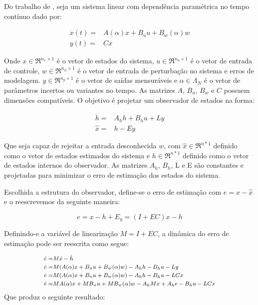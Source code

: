 Do trabalho de \cite{Dias2022ItaloDias}, seja um sistema linear com dependência paramétrica no tempo contínuo dado por:

\begin{equation}\label{eq:part_linsys}
    \begin{split}
        \dot{x}(t)=&A(\alpha)x+B_uu+B_w(\alpha)w\\
              y(t)=&Cx
    \end{split}
\end{equation}

Onde $x \in \Re^{n_{x} \times 1}$ é o vetor de estados do sistema, $u \in \Re^{n_{u} \times 1}$ é o vetor de entrada de controle, $w \in \Re^{n_{w} \times 1}$ é o vetor de entrada de perturbação no sistema e erros de modelagem.  $y \in \Re^{n_{y} \times 1}$ é o vetor de saídas mensuráveis e  $\alpha \in \Lambda_N$  é o vetor de parâmetros incertos ou variantes no tempo. As matrizes $A$, $B_u$, $B_w$ e $C$ possuem dimensões compatíveis.
O objetivo é projetar um observador de estados na forma:

\begin{equation}\label{eq:UIO}
    \begin{split}
        \dot{h}=&A_hh+B_hu+Ly\\
              \hat{x}=&h-Ey
    \end{split}
\end{equation}

Que seja capaz de rejeitar a entrada desconhecida $w$, com $\hat{x} \in \Re^{n*1}$ definido como o vetor de estados estimados do sistema e $h \in \Re^{n*1}$ definido como o vetor de estados internos do observador. As matrizes $A_h$, $B_h$, L e E são constantes e projetadas para minimizar o erro de estimação dos estados do sistema.

Escolhida a estrutura do observador, define-se o erro de estimação com $e=x-\hat{x}$ e o reescrevemos da seguinte maneira:

\begin{equation}
    e=x-h+E_y = (I+EC)x-h
\end{equation}

Definindo-e a variável de linearização $M=I+EC$, a dinâmica do erro de estimação pode ser reescrita como segue:

\begin{equation} \footnotesize
    \begin{split}
        \dot{e}=&M\dot{x}-\dot{h}\\
        \dot{e}=&M(A(\alpha)x+B_uu+B_w(\alpha)w)-A_hh-B_hu-Ly\\
        \dot{e}=&M(A(\alpha)x+B_uu+B_w(\alpha)w)-A_hh-B_hu-LCx\\
        \dot{e}=&MA(\alpha)x+MB_uu+MB_w(\alpha)w-A_hMx+A_he-B_hu-LCx\\
    \end{split}   
\end{equation}
\normalsize
Que produz o seguinte resultado:


